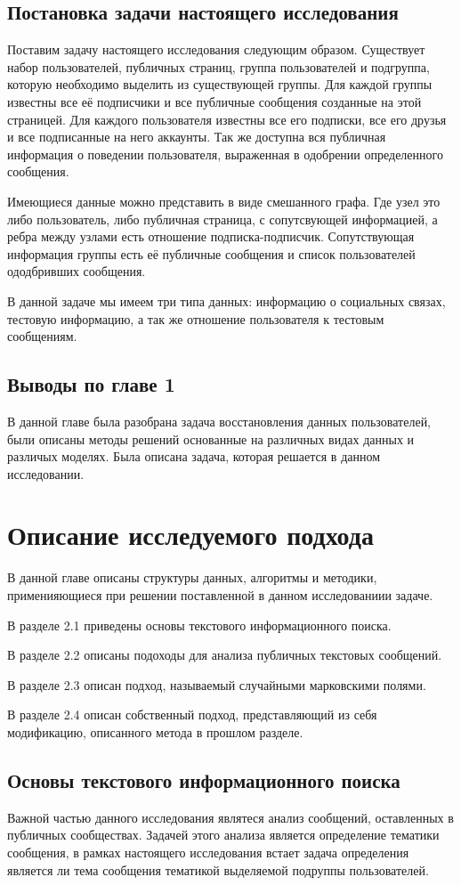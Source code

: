 \documentclass[annotation,times,page4]{itmo-student-thesis}
\begin{document}
\section{Постановка задачи настоящего исследования}
Поставим задачу настоящего исследования следующим образом. Существует набор пользователей, публичных страниц, группа пользователей и подгруппа, которую необходимо выделить из существующей группы. Для каждой группы известны все её подписчики и все публичные сообщения созданные на этой страницей. Для каждого пользователя известны все его подписки, все его друзья и все подписанные на него аккаунты. Так же доступна вся публичная информация о поведении пользователя, выраженная в одобрении определенного сообщения.

Имеющиеся данные можно представить в виде смешанного графа. Где узел это либо пользователь, либо публичная страница, с сопутсвующей информацией, а ребра между узлами есть отношение подписка-подписчик. Сопутствующая информация группы есть её публичные сообщения и список пользователей ододбривших сообщения. 

В данной задаче мы имеем три типа данных: информацию о социальных связах, тестовую информацию, а так же отношение пользователя к тестовым сообщениям. 

\section{Выводы по главе 1}
В данной главе была разобрана задача восстановления данных пользователей, были описаны методы решений основанные на различных видах данных и различых моделях. Была описана задача, которая решается в данном исследовании.

\chapter{Описание исследуемого подхода}
В данной главе описаны структуры данных, алгоритмы и методики, применияющиеся при решении поставленной в данном исследованиии задаче.

В разделе 2.1 приведены основы текстового информационного поиска.

В разделе 2.2 описаны подоходы для анализа публичных текстовых сообщений.

В разделе 2.3 описан подход, называемый случайными марковскими полями.

В разделе 2.4 описан собственный подход, представляющий из себя модификацию, описанного метода в прошлом разделе. 
\section{Основы текстового информационного поиска}
Важной частью данного исследования являтеся анализ сообщений, оставленных в публичных сообществах. Задачей этого анализа является определение тематики сообщения, в рамках настоящего исследования встает задача определения является ли тема сообщения тематикой выделяемой подруппы пользователей.
\end{document}

